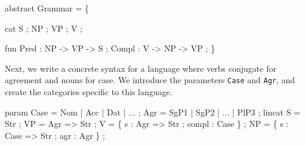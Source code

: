 \documentclass[10pt,a4paper]{article}
\newenvironment{Shaded}{\begin{snugshade}}{\end{snugshade}}
\newcommand{\DataTypeTok}[1]{\textcolor[rgb]{0.13,0.29,0.53}{{#1}}}
\newcommand{\OtherTok}[1]{\textcolor[rgb]{0.56,0.35,0.01}{{#1}}}
\newcommand{\FunctionTok}[1]{\textcolor[rgb]{0.00,0.00,0.00}{{#1}}}
\newcommand{\NormalTok}[1]{{#1}}
\begin{document}
\begin{Shaded}
\begin{Highlighting}[]
  \NormalTok{abstract }\DataTypeTok{Grammar} \FunctionTok{=} \NormalTok{\{}

  \NormalTok{cat }
    \DataTypeTok{S} \NormalTok{; }\DataTypeTok{NP} \NormalTok{; }\DataTypeTok{VP} \NormalTok{; }\DataTypeTok{V} \NormalTok{;}

  \NormalTok{fun}
    \DataTypeTok{Pred} \FunctionTok{:} \DataTypeTok{NP} \OtherTok{->} \DataTypeTok{VP} \OtherTok{->} \DataTypeTok{S} \NormalTok{;}
    \DataTypeTok{Compl} \FunctionTok{:} \DataTypeTok{V} \OtherTok{->} \DataTypeTok{NP} \OtherTok{->} \DataTypeTok{VP} \NormalTok{;}
  \NormalTok{\}}
\end{Highlighting}
\end{Shaded}




Next, we write a concrete syntax for a language where verbs conjugate
for agreement and nouns for case. 
We introduce the parameters \texttt{Case} and \texttt{Agr}, and create
the categories specific to this language.


\begin{Shaded}
\begin{Highlighting}[]
  \NormalTok{param}
    \DataTypeTok{Case} \FunctionTok{=} \DataTypeTok{Nom} \FunctionTok{|} \DataTypeTok{Acc} \FunctionTok{|} \DataTypeTok{Dat} \FunctionTok{|} \FunctionTok{...} \NormalTok{;}
    \DataTypeTok{Agr} \FunctionTok{=} \DataTypeTok{SgP1} \FunctionTok{|} \DataTypeTok{SgP2} \FunctionTok{|} \FunctionTok{...} \FunctionTok{|} \DataTypeTok{PlP3} \NormalTok{;}
  \NormalTok{lincat }
    \DataTypeTok{S}  \FunctionTok{=} \DataTypeTok{Str} \NormalTok{;}
    \DataTypeTok{VP} \FunctionTok{=} \DataTypeTok{Agr} \OtherTok{=>} \DataTypeTok{Str} \NormalTok{;}
    \DataTypeTok{V} \FunctionTok{=} \NormalTok{\{ s }\FunctionTok{:} \DataTypeTok{Agr} \OtherTok{=>} \DataTypeTok{Str} \NormalTok{; compl }\FunctionTok{:} \DataTypeTok{Case} \NormalTok{\} ;}
    \DataTypeTok{NP} \FunctionTok{=} \NormalTok{\{ s }\FunctionTok{:} \DataTypeTok{Case} \OtherTok{=>} \DataTypeTok{Str} \NormalTok{; agr }\FunctionTok{:} \DataTypeTok{Agr} \NormalTok{\} ;}
\end{Highlighting}
\end{Shaded}
\end{document}
